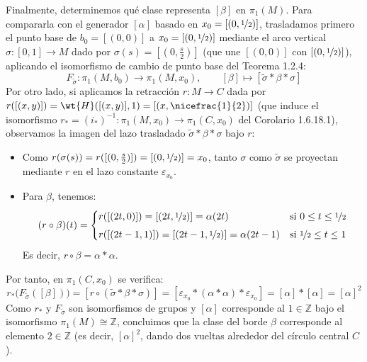 \documentclass[12pt]{article}
\begin{document}
\begin{ejercicio}
        \medskip
        \noindent
        Finalmente, determinemos qué clase representa $[\beta]$ en $\pi_1(M)$. Para compararla con el generador $[\alpha]$ basado en $x_0 = [(0,\nicefrac{1}{2})]$, trasladamos primero el punto base de $b_0 = [(0,0)]$ a $x_0 = [(0,\nicefrac{1}{2})]$ mediante el arco vertical $\sigma:[0,1]\to M$ dado por $\sigma(s) = [(0, \frac{s}{2})]$ (que une $[(0,0)]$ con $[(0,\nicefrac{1}{2})]$), aplicando el isomorfismo de cambio de punto base del Teorema 1.2.4:
        \begin{equation*}
            F_{\tilde{\sigma}} : \pi_1(M, b_0) \longrightarrow \pi_1(M, x_0), \qquad [\beta] \longmapsto [\tilde{\sigma} * \beta * \sigma]
        \end{equation*}
        Por otro lado, si aplicamos la retracción $r:M\to C$ dada por $r([(x,y)]) = \wt{H}([(x,y)],1) = [(x,\nicefrac{1}{2})]$ (que induce el isomorfismo $r_* = (i_*)^{-1} : \pi_1(M, x_0) \to \pi_1(C, x_0)$ del Corolario 1.6.18.1), observamos la imagen del lazo trasladado $\tilde{\sigma} * \beta * \sigma$ bajo $r$:
        \begin{itemize}
            \item Como $r(\sigma(s)) = r([(0, \frac{s}{2})]) = [(0, \nicefrac{1}{2})] = x_0$, tanto $\sigma$ como $\tilde{\sigma}$ se proyectan mediante $r$ en el lazo constante $\varepsilon_{x_0}$.
            \item Para $\beta$, tenemos:
            \begin{equation*}
                (r\circ \beta)(t) = \begin{cases}
                    r([(2t,0)]) = [(2t, \nicefrac{1}{2})] = \alpha(2t) & \text{si } 0\leq t \leq \nicefrac{1}{2} \\[4pt]
                    r([(2t-1,1)]) = [(2t-1, \nicefrac{1}{2})] = \alpha(2t-1) & \text{si } \nicefrac{1}{2}\leq t \leq 1
                \end{cases}
            \end{equation*}
            Es decir, $r\circ \beta = \alpha * \alpha$.
        \end{itemize}
        Por tanto, en $\pi_1(C, x_0)$ se verifica:
        \begin{equation*}
            r_*\big(F_{\tilde{\sigma}}([\beta])\big) = [r\circ (\tilde{\sigma} * \beta * \sigma)] = [\varepsilon_{x_0} * (\alpha * \alpha) * \varepsilon_{x_0}] = [\alpha] * [\alpha] = [\alpha]^2
        \end{equation*}
        Como $r_*$ y $F_{\tilde{\sigma}}$ son isomorfismos de grupos y $[\alpha]$ corresponde al $1\in \mathbb{Z}$ bajo el isomorfismo $\pi_1(M) \cong \mathbb{Z}$, concluimos que la clase del borde $\beta$ corresponde al elemento $2 \in \mathbb{Z}$ (es decir, $[\alpha]^2$, dando dos vueltas alrededor del círculo central $C$).
    \end{ejercicio}
\end{document}
